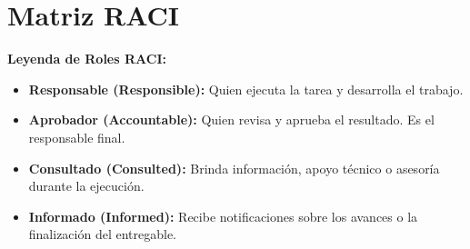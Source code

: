 \section{Matriz RACI}




\noindent\textbf{Leyenda de Roles RACI:}
\vspace{0.2cm}
\begin{itemize}[itemsep=0.1cm]
    \item \colorbox{colR}{} \textbf{Responsable (Responsible):} Quien ejecuta la tarea y desarrolla el trabajo.
    \item \colorbox{colA}{} \textbf{Aprobador (Accountable):} Quien revisa y aprueba el resultado. Es el responsable final.
    \item \colorbox{colC}{} \textbf{Consultado (Consulted):} Brinda información, apoyo técnico o asesoría durante la ejecución.
    \item \colorbox{colI}{} \textbf{Informado (Informed):} Recibe notificaciones sobre los avances o la finalización del entregable.
\end{itemize}
\vspace{0.6cm}

